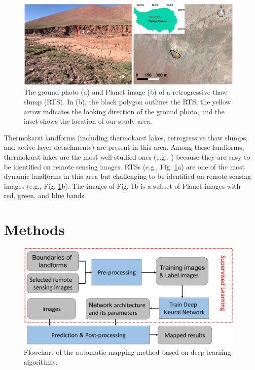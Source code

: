 \documentclass[preprint,12pt,authoryear]{elsarticle}
\begin{document}
\begin{figure}[ht]
	\centering
	\includegraphics[width=14cm]{figures/study_area_loc_RTS_photo_trim.jpg}
	\caption{The ground photo (a) and Planet image (b) of a retrogressive thaw slump (RTS). In (b), the black polygon outlines the RTS, the yellow arrow indicates the looking direction of the ground photo, and the inset shows the location of our study area.}
	\label{fig_rts_groundphoto}
\end{figure}

Thermokarst landforms (including thermokarst lakes, retrogressive thaw slumps, and active layer detachments) are present in this area. Among these landforms, thermokarst lakes are the most well-studied ones (e.g.,  \citealp{luo_thermokarst_2015, lin2010thermal}) because they are easy to be identified on remote sensing images. RTSs (e.g., Fig. \ref{fig_rts_groundphoto}a) are one of the most dynamic landforms in this area but challenging to be identified on remote sensing images (e.g., Fig. \ref{fig_rts_groundphoto}b). The images of Fig. 1b is a subset of Planet images with red, green, and blue bands. 

\section{Methods}
\label{sec_meth}

\begin{figure}[ht]
	\centering
	\includegraphics[width=12cm]{figures/flowchart_trim.jpg}
	\caption{Flowchart of the automatic mapping method based on deep learning algorithms.}
	\label{fig_flowchart}
\end{figure}
\end{document}
